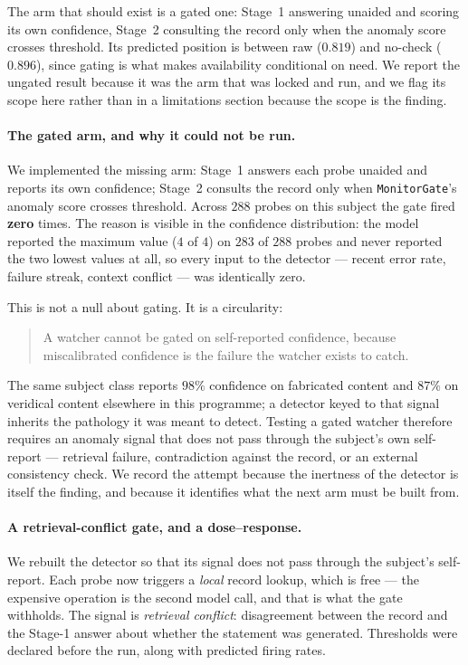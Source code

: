 \documentclass[11pt]{article}
\begin{document}
The arm that should exist is a gated one: Stage~1 answering unaided and
scoring its own confidence, Stage~2 consulting the record only when the
anomaly score crosses threshold. Its predicted position is between raw
($0.819$) and no-check ($0.896$), since gating is what makes availability
conditional on need. We report the ungated result because it was the arm that
was locked and run, and we flag its scope here rather than in a limitations
section because the scope is the finding.

\paragraph{The gated arm, and why it could not be run.} We implemented the
missing arm: Stage~1 answers each probe unaided and reports its own confidence;
Stage~2 consults the record only when \texttt{MonitorGate}'s anomaly score
crosses threshold. Across $288$ probes on this subject the gate fired
\textbf{zero} times. The reason is visible in the confidence distribution: the
model reported the maximum value ($4$ of $4$) on $283$ of $288$ probes and
never reported the two lowest values at all, so every input to the detector ---
recent error rate, failure streak, context conflict --- was identically zero.

This is not a null about gating. It is a circularity:

\begin{quote}
A watcher cannot be gated on self-reported confidence, because miscalibrated
confidence is the failure the watcher exists to catch.
\end{quote}

The same subject class reports $98\%$ confidence on fabricated content and
$87\%$ on veridical content elsewhere in this programme; a detector keyed to
that signal inherits the pathology it was meant to detect. Testing a gated
watcher therefore requires an anomaly signal that does not pass through the
subject's own self-report --- retrieval failure, contradiction against the
record, or an external consistency check. We record the attempt because the
inertness of the detector is itself the finding, and because it identifies what
the next arm must be built from.

\paragraph{A retrieval-conflict gate, and a dose--response.} We rebuilt the
detector so that its signal does not pass through the subject's self-report.
Each probe now triggers a \emph{local} record lookup, which is free --- the
expensive operation is the second model call, and that is what the gate
withholds. The signal is \emph{retrieval conflict}: disagreement between the
record and the Stage-1 answer about whether the statement was generated.
Thresholds were declared before the run, along with predicted firing rates.
\end{document}
